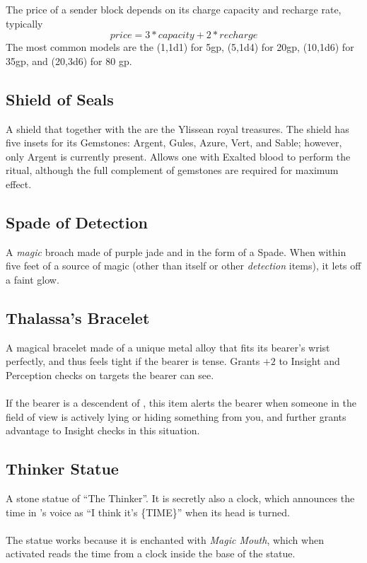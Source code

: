 The price of a sender block depends on its charge capacity and recharge rate, typically
\[ price = 3 * capacity + 2*recharge \]
The most common models are the (1,1d1) for 5gp, (5,1d4) for 20gp, (10,1d6) for 35gp, and (20,3d6) for 80 gp. 


\subsection{Shield of Seals}
\label{items:fireemblem}
A shield that together with the  are the Ylissean royal treasures. The shield has five insets for its Gemstones: Argent, Gules, Azure, Vert, and Sable; however, only Argent is currently present. Allows one with Exalted blood to perform the  ritual, although the full complement of gemstones are required for maximum effect.

\subsection{Spade of Detection}
\label{items:detectspade}
A \textit{magic} broach made of purple jade and in the form of a Spade. When within five feet of a source of magic (other than itself or other \textit{detection} items), it lets off a faint glow.

\subsection{Thalassa's Bracelet}
\label{items:bracelet}
A magical bracelet made of a unique metal alloy that fits its bearer's wrist perfectly, and thus feels tight if the bearer is tense. Grants $+2$ to Insight and Perception checks on targets the bearer can see.\\
\\
If the bearer is a descendent of , this item alerts the bearer when someone in the field of view is actively lying or hiding something from you, and further grants advantage to Insight checks in this situation.

\subsection{Thinker Statue}
\label{items:thinker}
A stone statue of ``The Thinker''. It is secretly also a clock, which announces the time in 's voice as ``I think it's \{TIME\}'' when its head is turned. \\
\\
The statue works because it is enchanted with \textit{Magic Mouth}, which when activated reads the time from a clock inside the base of the statue.

